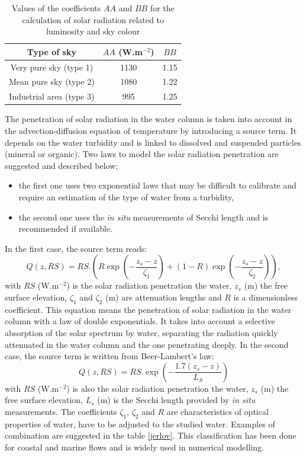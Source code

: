 \begin{table}[ptbh]
\caption{Values of the coefficients $AA$ and $BB$ for the calculation of solar
radiation related to luminosity and sky colour }%
\label{tab_sky_type}%
\centering
\begin{tabular}
[c]{|c|c|c|}\hline
Type of sky & $AA$ (W.m$^{-2}$) & $BB$\\\hline
Very pure sky (type 1) & 1130 & 1.15\\\hline
Mean pure sky (type 2) & 1080 & 1.22\\\hline
Industrial area (type 3) & 995 & 1.25\\\hline
\end{tabular}
\end{table}

The penetration of solar radiation in the water column is taken into account
in the advection-diffusion equation of temperature by introducing a source
term. It depends on the water turbidity and is linked to dissolved and
suspended particles (mineral or organic). Two laws to model the solar
radiation penetration are suggested and described below:
\begin{itemize}
\item the first one uses two exponential laws that may be difficult to
calibrate and require an estimation of the type of water from a turbidity,
\item the second one uses the \emph{in situ} measurements of Secchi length and
is recommended if available.
\end{itemize}
In the first case, the source term reads:
\begin{equation}
Q(z,RS) = RS.\left(  R \exp\left(  -\dfrac{z_{s}-z}{\zeta_{1}} \right)  + (1-R)
\exp\left(  -\dfrac{z_{s}-z}{\zeta_{2}} \right)  \right)  ,
\end{equation}
with $RS$ ($\mathrm{{W}.m^{-2}}$) is the solar radiation penetration the
water, $z_{s}$ (m) the free surface elevation, $\zeta_{1}$ and $\zeta_{2}$ (m)
are attenuation lengths and $R$ is a dimensionless coefficient.
This equation means the penetration of solar radiation in the water column
with a law of double exponentials. It takes into account a selective
absorption of the solar spectrum by water, separating the radiation quickly
attenuated in the water column and the one penetrating deeply.
In the second case, the source term is written from Beer-Lambert's law:
\begin{equation}
Q(z,RS) = RS. \exp\left(  -\dfrac{1.7(z_{s}-z)}{L_{S}} \right)
\end{equation}
with $RS$ ($\mathrm{{W}.m^{-2}}$) is also the solar radiation penetration the
water, $z_{s}$ (m) the free surface elevation, $L_{s}$ (m) is the Secchi
length provided by \emph{in situ} measurements.
The coefficients $\zeta_{1}$, $\zeta_{2}$ and $R$ are characteristics of
optical properties of water, have to be adjusted to the studied water.
Examples of combination are suggested in the table \ref{jerlov}. This
classification has been done for coastal and marine flows and is widely used
in numerical modelling.

